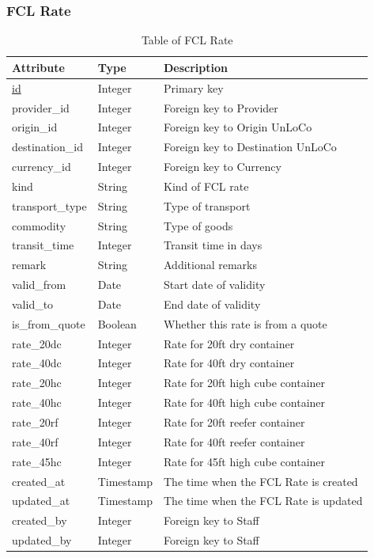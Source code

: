 \subsubsection{FCL Rate}
\begin{table}[H]
    \centering
    \begin{tabular}{|p{3cm}|p{2cm}|p{\dimexpr\textwidth-6.8cm}|} %
        \hline
        \rowcolor[HTML]{C0C0C0} 
        \textbf{Attribute} & \textbf{Type} & \textbf{Description} \\ \hline
        \underline{id} & Integer & Primary key \\ \hline
        provider\_id & Integer & Foreign key to Provider \\ \hline
        origin\_id & Integer & Foreign key to Origin UnLoCo \\ \hline
        destination\_id & Integer & Foreign key to Destination UnLoCo \\ \hline
        currency\_id & Integer & Foreign key to Currency \\ \hline
        kind & String & Kind of FCL rate \\ \hline
        transport\_type & String & Type of transport \\ \hline
        commodity & String & Type of goods \\ \hline
        transit\_time & Integer & Transit time in days \\ \hline
        remark & String & Additional remarks \\ \hline
        valid\_from & Date & Start date of validity \\ \hline
        valid\_to & Date & End date of validity \\ \hline
        is\_from\_quote & Boolean & Whether this rate is from a quote \\ \hline
        rate\_20dc & Integer & Rate for 20ft dry container \\ \hline
        rate\_40dc & Integer & Rate for 40ft dry container \\ \hline
        rate\_20hc & Integer & Rate for 20ft high cube container \\ \hline
        rate\_40hc & Integer & Rate for 40ft high cube container \\ \hline
        rate\_20rf & Integer & Rate for 20ft reefer container \\ \hline
        rate\_40rf & Integer & Rate for 40ft reefer container \\ \hline
        rate\_45hc & Integer & Rate for 45ft high cube container \\ \hline
        created\_at & Timestamp & The time when the FCL Rate is created \\ \hline
        updated\_at & Timestamp & The time when the FCL Rate is updated \\ \hline
        created\_by & Integer & Foreign key to Staff \\ \hline
        updated\_by & Integer & Foreign key to Staff \\ \hline
    \end{tabular}
    \caption{Table of FCL Rate}
    \label{tab:fcl-rate-table} 
\end{table}

